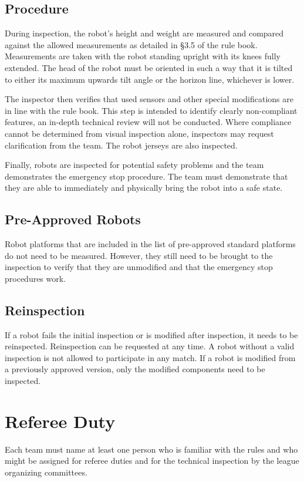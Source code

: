 \documentclass[12pt]{article}
\begin{document}
	\subsection{Procedure}
	During inspection, the robot's height and weight are measured and compared against the allowed measurements as detailed in §3.5 of the rule book. Measurements are taken with the robot standing upright with its knees fully extended. The head of the robot must be oriented in such a way that it is tilted to either its maximum upwards tilt angle or the horizon line, whichever is lower. 
	
	The inspector then verifies that used sensors and other special modifications are in line with the rule book. This step is intended to identify clearly non-compliant features, an in-depth technical review will not be conducted. Where compliance cannot be determined from visual inspection alone, inspectors may request clarification from the team. The robot jerseys are also inspected.
	
	Finally, robots are inspected for potential safety problems and the team demonstrates the emergency stop procedure. The team must demonstrate that they are able to immediately and physically bring the robot into a safe state.
	
	\subsection{Pre-Approved Robots}
	Robot platforms that are included in the list of pre-approved standard platforms do not need to be measured. However, they still need to be brought to the inspection to verify that they are unmodified and that the emergency stop procedures work.
	
	\subsection{Reinspection}
	If a robot fails the initial inspection or is modified after inspection, it needs to be reinspected. Reinspection can be requested at any time. A robot without a valid inspection is not allowed to participate in any match. If a robot is modified from a previously approved version, only the modified components need to be inspected.
	
	\section{Referee Duty}
	Each team must name at least one person who is familiar with the rules and who might be assigned for referee duties and for the technical inspection by the league organizing committees.
	
\end{document}
